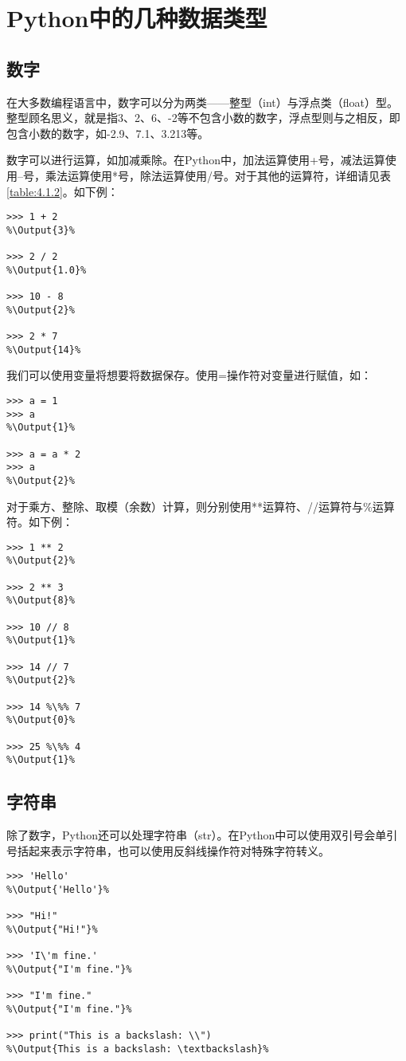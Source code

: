 \section{Python中的几种数据类型}
\subsection{数字}
在大多数编程语言中，数字可以分为两类——整型（int）与浮点类（float）型。整型顾名思义，就是指3、2、6、-2等不包含小数的数字，浮点型则与之相反，即包含小数的数字，如-2.9、7.1、3.213等。

数字可以进行运算，如加减乘除。在Python中，加法运算使用+号，减法运算使用--号，乘法运算使用*号，除法运算使用/号。对于其他的运算符，详细请见表\ref{table:4.1.2}。如下例：
\begin{lstlisting}
>>> 1 + 2
%\Output{3}%

>>> 2 / 2
%\Output{1.0}%

>>> 10 - 8
%\Output{2}%

>>> 2 * 7
%\Output{14}%
\end{lstlisting}

\begin{ExtraKnowledge}
    我们可以使用变量将想要将数据保存。使用=操作符对变量进行赋值，如：
    \begin{lstlisting}[numbers=none]
>>> a = 1
>>> a
%\Output{1}%

>>> a = a * 2
>>> a
%\Output{2}%
    \end{lstlisting}
\end{ExtraKnowledge}

对于乘方、整除、取模（余数）计算，则分别使用**运算符、//运算符与\%运算符。如下例：
\begin{lstlisting}
>>> 1 ** 2
%\Output{2}%

>>> 2 ** 3
%\Output{8}%

>>> 10 // 8
%\Output{1}%

>>> 14 // 7
%\Output{2}%

>>> 14 %\%% 7
%\Output{0}%

>>> 25 %\%% 4
%\Output{1}%
\end{lstlisting}

\subsection{字符串}
除了数字，Python还可以处理字符串（str）。在Python中可以使用双引号会单引号括起来表示字符串，也可以使用反斜线操作符对特殊字符转义。

\begin{lstlisting}
>>> 'Hello'
%\Output{'Hello'}%

>>> "Hi!"
%\Output{"Hi!"}%

>>> 'I\'m fine.'
%\Output{"I'm fine."}%

>>> "I'm fine."
%\Output{"I'm fine."}%

>>> print("This is a backslash: \\")
%\Output{This is a backslash: \textbackslash}%

\end{lstlisting}

